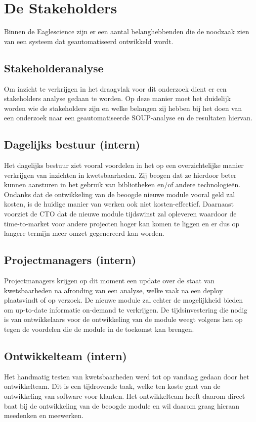 \section{De Stakeholders}\label{sec:de-stakeholders}
Binnen de Eaglescience zijn er een aantal belanghebbenden die de noodzaak zien van een systeem dat geautomatiseerd ontwikkeld wordt.

\subsection{Stakeholderanalyse}\label{subsec:stakeholdersanalyse1}
Om inzicht te verkrijgen in het draagvlak voor dit onderzoek dient er een stakeholders analyse gedaan te worden. Op deze manier moet het duidelijk worden wie de stakeholders zijn en welke belangen zij hebben bij het doen van een onderzoek naar een geautomatiseerde SOUP-analyse en de resultaten hiervan.

\subsection{Dagelijks bestuur (intern)}\label{subsec:dagelijks-bestuur-(intern)1}
Het dagelijks bestuur ziet vooral voordelen in het op een overzichtelijke manier verkrijgen van inzichten in kwetsbaarheden. Zij beogen dat ze hierdoor beter kunnen aansturen in het gebruik van bibliotheken en/of andere technologieën. Ondanks dat de ontwikkeling van de beoogde nieuwe module vooral geld zal kosten, is de huidige manier van werken ook niet kosten-effectief. Daarnaast voorziet de CTO dat de nieuwe module tijdswinst zal opleveren waardoor de time-to-market voor andere projecten hoger kan komen te liggen en er dus op langere termijn meer omzet gegenereerd kan worden.

\subsection{Projectmanagers (intern)}\label{subsec:projectmanagers-(intern)1}
Projectmanagers krijgen op dit moment een update over de staat van kwetsbaarheden na afronding van een analyse, welke vaak na een deploy plaatsvindt of op verzoek. De nieuwe module zal echter de mogelijkheid bieden om up-to-date informatie on-demand te verkrijgen.
De tijdsinvestering die nodig is van ontwikkelaars voor de ontwikkeling van de module weegt volgens hen op tegen de voordelen die de module in de toekomst kan brengen.

\subsection{Ontwikkelteam (intern)}\label{subsec:ontwikkelteam-(intern)1}
Het handmatig testen van kwetsbaarheden werd tot op vandaag gedaan door het ontwikkelteam. Dit is een tijdrovende taak, welke ten koste gaat van de ontwikkeling van software voor klanten. Het ontwikkelteam heeft daarom direct baat bij de ontwikkeling van de beoogde module en wil daarom graag hieraan meedenken en meewerken.

